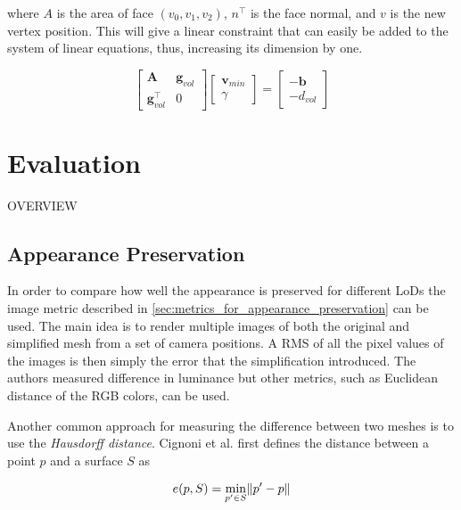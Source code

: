 where $A$ is the area of face $(v_0, v_1, v_2)$, $n^\intercal$ is the face normal, and $v$ is the new vertex position. This will give a linear constraint that can easily be added to the system of linear equations, thus, increasing its dimension by one.

\begin{equation} \label{eq:volume_constraint}
  \begin{bmatrix}
    \mathbf{A}                & \mathbf{g}_{vol} \\
     \mathbf{g}_{vol}^\intercal & 0
  \end{bmatrix}
  \begin{bmatrix}
    \mathbf{v}_{min} \\
    \gamma
  \end{bmatrix}
  =
  \begin{bmatrix}
    -\mathbf{b} \\
    -d_{vol}
  \end{bmatrix}
\end{equation}




\section{Evaluation} \label{sec:evaluation}
OVERVIEW

\subsection{Appearance Preservation}
In order to compare how well the appearance is preserved for different LoDs the image metric described in \cref{sec:metrics_for_appearance_preservation} can be used. The main idea is to render multiple images of both the original and simplified mesh from a set of camera positions. A RMS of all the pixel values of the images is then simply the error that the simplification introduced. The authors \cite{lindstrom2000image} measured difference in luminance but other metrics, such as Euclidean distance of the RGB colors, can be used.

Another common approach for measuring the difference between two meshes is to use the \emph{Hausdorff distance}. Cignoni et al. \cite{cignoni1998metro} first defines the distance between a point $p$ and a surface $S$ as

\[e(p, S) = \min_{p' \in S} \norm*{p' - p}\]

